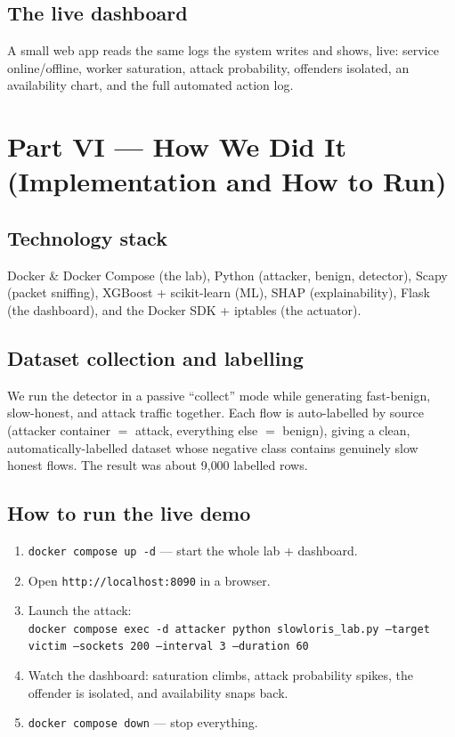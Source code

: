 \documentclass[11pt,a4paper]{article}
\begin{document}
\subsection{The live dashboard}
A small web app reads the same logs the system writes and shows, live: service
online/offline, worker saturation, attack probability, offenders isolated, an
availability chart, and the full automated action log.

\section{Part VI --- How We Did It (Implementation and How to Run)}

\subsection{Technology stack}
Docker \& Docker Compose (the lab), Python (attacker, benign, detector), Scapy
(packet sniffing), XGBoost + scikit-learn (ML), SHAP (explainability), Flask (the
dashboard), and the Docker SDK + iptables (the actuator).

\subsection{Dataset collection and labelling}
We run the detector in a passive ``collect'' mode while generating fast-benign,
slow-honest, and attack traffic together. Each flow is auto-labelled by source
(attacker container $=$ attack, everything else $=$ benign), giving a clean,
automatically-labelled dataset whose negative class contains genuinely slow honest
flows. The result was about 9{,}000 labelled rows.

\subsection{How to run the live demo}
\begin{enumerate}
  \item \texttt{docker compose up -d} --- start the whole lab + dashboard.
  \item Open \texttt{http://localhost:8090} in a browser.
  \item Launch the attack:\\
  \texttt{docker compose exec -d attacker python slowloris\_lab.py --target victim
  --sockets 200 --interval 3 --duration 60}
  \item Watch the dashboard: saturation climbs, attack probability spikes, the
  offender is isolated, and availability snaps back.
  \item \texttt{docker compose down} --- stop everything.
\end{enumerate}
\end{document}
